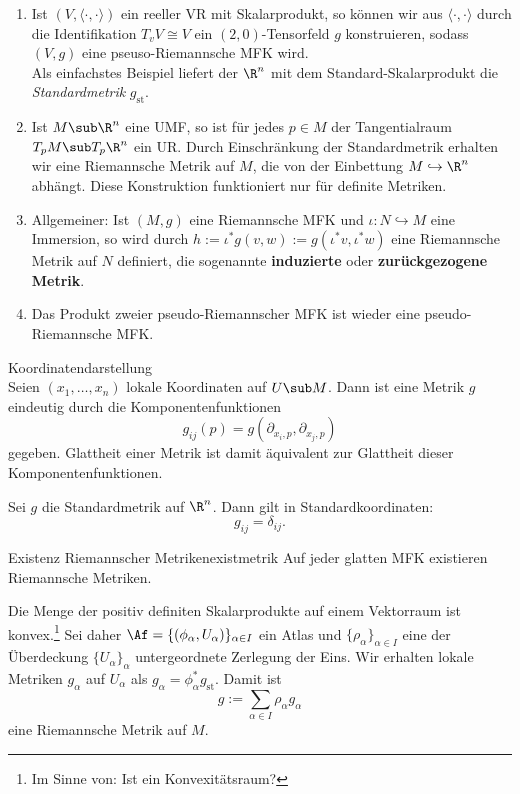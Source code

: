 \begin{beispiele}
\begin{enumerate}
\item Ist $(V, \langle \cdot , \cdot \rangle)$ ein reeller VR mit Skalarprodukt, so können wir aus $\langle \cdot, \cdot \rangle$ durch die Identifikation $T_v V \cong V$ ein $(2,0)$-Tensorfeld $g$ konstruieren, sodass $(V,g)$ eine pseuso-Riemannsche MFK wird.\\
Als einfachstes Beispiel liefert der $\R^n$ mit dem Standard-Skalarprodukt die \textit{Standardmetrik} $g_\text{st}$.
\item Ist $M \sub \R^n$ eine UMF, so ist für jedes $p \in M$ der Tangentialraum $T_pM \sub T_p\R^n$ ein UR. Durch Einschränkung der Standardmetrik erhalten wir eine Riemannsche Metrik auf $M$, die von der Einbettung $M \hookrightarrow \R^n$ abhängt. Diese Konstruktion funktioniert nur für definite Metriken.
\item Allgemeiner: Ist $(M,g)$ eine Riemannsche MFK und $\iota: N \hookrightarrow M$ eine Immersion, so wird durch $h:=\iota^\ast g(v,w) := g(\iota^\ast v, \iota^\ast w)$ eine Riemannsche Metrik auf $N$ definiert, die sogenannte \textbf{induzierte} oder \textbf{zurückgezogene Metrik}.
\item Das Produkt zweier pseudo-Riemannscher MFK ist wieder eine pseudo-Riemannsche MFK.
\end{enumerate}
\end{beispiele}
\begin{bemerkung}Koordinatendarstellung\\
Seien $(x_1, \dots, x_n)$ lokale Koordinaten auf $U \sub M$. Dann ist eine Metrik $g$ eindeutig durch die Komponentenfunktionen
\begin{equation}
g_{ij}(p) = g(\partial_{x_i,p}, \partial_{x_j, p})
\end{equation}
gegeben. Glattheit einer Metrik ist damit äquivalent zur Glattheit dieser Komponentenfunktionen.
\end{bemerkung}
\begin{beispiel}
Sei $g$ die Standardmetrik auf $\R^n$. Dann gilt in Standardkoordinaten:
\begin{equation}
g_{ij}=\delta_{ij}.
\end{equation}
\end{beispiel}
\begin{satz}{Existenz Riemannscher Metriken}{existmetrik}
Auf jeder glatten MFK existieren Riemannsche Metriken.
\end{satz}
\begin{beweis}
Die Menge der positiv definiten Skalarprodukte auf einem Vektorraum ist konvex.\footnote{Im Sinne von: Ist ein Konvexitätsraum?} Sei daher $\Af = \{ (\phi_\alpha, U_\alpha )\}_{\alpha \in I}$ ein Atlas und $\{ \rho_\alpha \}_{\alpha \in I} $ eine der Überdeckung $\{U_\alpha\}_\alpha$ untergeordnete Zerlegung der Eins. Wir erhalten lokale Metriken $g_\alpha$ auf $U_\alpha$ als $g_\alpha = \phi_\alpha^\ast g_\text{st}$. Damit ist 
\begin{equation}
g := \sum_{\alpha \in I} \rho_\alpha g_\alpha
\end{equation} 
eine Riemannsche Metrik auf $M$.
\end{beweis}
